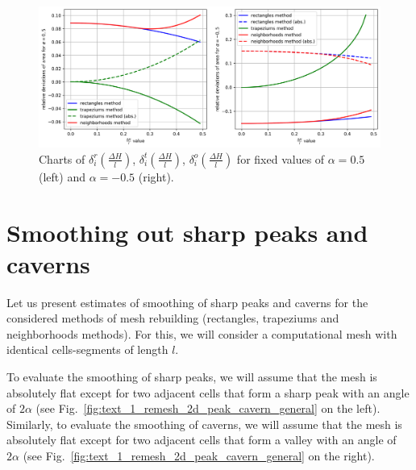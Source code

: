 \documentclass[
11pt,%
tightenlines,%
twoside,%
onecolumn,%
nofloats,%
nobibnotes,%
nofootinbib,%
superscriptaddress,%
noshowpacs,%
centertags]%
{revtex4}
\begin{document}
\begin{figure}[ht]
\setcaptionmargin{5mm}
\onelinecaptionsfalse %
\includegraphics[width=1.0\textwidth]{pics/remesh_fix_alfa_chart.png}
\caption{Charts of $\delta_i^r(\frac{\Delta H}{l})$, $\delta_i^t(\frac{\Delta H}{l})$, $\delta_i^o(\frac{\Delta H}{l})$ for fixed values of $\alpha = 0.5$ (left) and $\alpha = -0.5$ (right).}
\label{fig:text_1_remesh_fix_alfa_chart}
\end{figure}


\section{Smoothing out sharp peaks and caverns}

Let us present estimates of smoothing of sharp peaks and caverns for the considered methods of mesh rebuilding (rectangles, trapeziums and neighborhoods methods). For this, we will consider a computational mesh with identical cells-segments of length $l$.

To evaluate the smoothing of sharp peaks, we will assume that the mesh is absolutely flat except for two adjacent cells that form a sharp peak with an angle of $2 \alpha$ (see Fig.~\ref{fig:text_1_remesh_2d_peak_cavern_general} on the left).
Similarly, to evaluate the smoothing of caverns, we will assume that the mesh is absolutely flat except for two adjacent cells that form a valley with an angle of $2 \alpha$ (see Fig.~\ref{fig:text_1_remesh_2d_peak_cavern_general} on the right).
\end{document}
